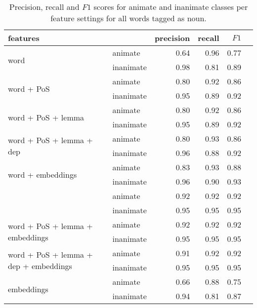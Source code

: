 \documentclass[a4paper,UKenglish]{oasics}
\begin{document}
\begin{table*}
\centering
\begin{tabular}{llrrrr}
\toprule
features                                               &           & precision & recall & $F1$ \\ \midrule
\multirow{2}{*}{word}                                  & animate   & 0.64      & 0.96   & 0.77 \\
                                                       & inanimate & 0.98      & 0.81   & 0.89 \\
\multirow{2}{*}{word + PoS}                            & animate   & 0.80      & 0.92   & 0.86 \\
                                                       & inanimate & 0.95      & 0.89   & 0.92 \\
\multirow{2}{*}{word + PoS + lemma}                    & animate   & 0.80      & 0.92   & 0.86 \\
                                                       & inanimate & 0.95      & 0.89   & 0.92 \\
\multirow{2}{*}{word + PoS + lemma + dep}              & animate   & 0.80      & 0.93   & 0.86 \\
                                                       & inanimate & 0.96      & 0.88   & 0.92 \\
\multirow{2}{*}{word + embeddings}                     & animate   & 0.83      & 0.93   & 0.88 \\
                                                       & inanimate & 0.96      & 0.90   & 0.93 \\
\rowcolor{Gray}                                        & animate   & 0.92      & 0.92   & 0.92 \\
\rowcolor{Gray}\multirow{-2}{*}{word + PoS + embeddings} & inanimate & 0.95    & 0.95   & 0.95 \\
\multirow{2}{*}{word + PoS + lemma + embeddings}       & animate   & 0.92      & 0.92   & 0.92 \\
                                                       & inanimate & 0.95      & 0.95   & 0.95 \\
\multirow{2}{*}{word + PoS + lemma + dep + embeddings} & animate   & 0.91      & 0.92   & 0.92 \\
                                                       & inanimate & 0.95      & 0.95   & 0.95 \\
\multirow{2}{*}{embeddings}                            & animate   & 0.66      & 0.88   & 0.75 \\
                                                       & inanimate & 0.94      & 0.81   & 0.87 \\

\bottomrule
\end{tabular}
\caption{Precision, recall and $F1$ scores for animate and inanimate classes
  per feature settings for all words tagged as noun.}
\label{tab:results-noun}
\end{table*}
\end{document}
